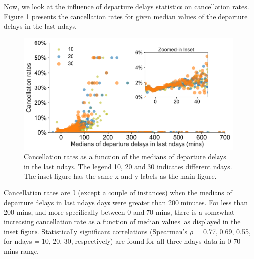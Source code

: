 \documentclass[12pt]{article}
\begin{document}
Now, we look at the influence of departure delays statistics on cancellation rates. Figure \ref{fig:depdelaymediancanrate} presents the cancellation rates for given median values of the departure delays in the last ndays. 
\begin{figure}[h!]
\begin{center}
\includegraphics[width=6in]{depdelaymedian_canrate.pdf}
\end{center}
\caption{\label{fig:depdelaymediancanrate}
Cancellation rates as a function of the medians of departure delays in the last ndays. The legend 10, 20 and 30 indicates different ndays. The inset figure has the same x and y labels as the main figure.}
\end{figure}

Cancellation rates are 0 (except a couple of instances) when the medians of departure delays in last ndays days were greater than 200 minutes. For less than 200 mins, and more specifically between 0 and 70 mins, there is a somewhat increasing cancellation rate as a function of median values, as displayed in the inset figure. Statistically significant correlations (Spearman's $\rho$ = 0.77, 0.69, 0.55, for ndays = 10, 20, 30, respectively) are found for all three ndays data in 0-70 mins range.  
\end{document}
